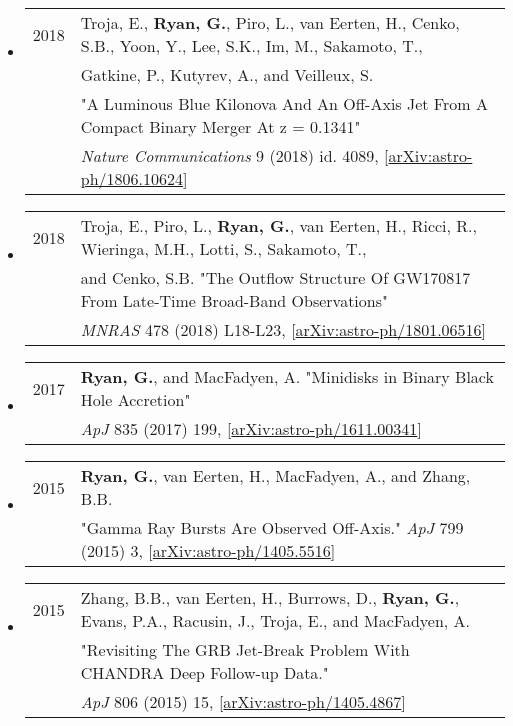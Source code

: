 \begin{itemize}
\item \begin{tabular}{ll}
2018 & Troja, E., {\bf Ryan, G.}, Piro, L., van Eerten, H., Cenko, S.B., Yoon, Y., Lee, S.K., Im, M., Sakamoto, T., \\
	& Gatkine, P., Kutyrev, A., and Veilleux, S. \\
	& "A Luminous Blue Kilonova And An Off-Axis Jet From A Compact Binary Merger At z = 0.1341"\\
	& \emph{Nature Communications} 9 (2018) id. 4089, [\href{https://arxiv.org/abs/1806.10624}{arXiv:astro-ph/1806.10624}]
\end{tabular}

\item \begin{tabular}{ll}
2018 & Troja, E., Piro, L., {\bf Ryan, G.}, van Eerten, H., Ricci, R., Wieringa, M.H., Lotti, S., Sakamoto, T.,\\
	& and Cenko, S.B. "The Outflow Structure Of GW170817 From Late-Time Broad-Band Observations" \\
	& \emph{MNRAS} 478 (2018) L18-L23, [\href{https://arxiv.org/abs/1801.06516}{arXiv:astro-ph/1801.06516}]
\end{tabular}

\item \begin{tabular}{ll}
2017 & {\bf Ryan, G.}, and MacFadyen, A. "Minidisks in Binary Black Hole Accretion" \\ 
	& \emph{ApJ} 835 (2017) 199, [\href{https://arxiv.org/abs/1611.00341}{arXiv:astro-ph/1611.00341}]
\end{tabular}

\item \begin{tabular}{ll}
2015 & {\bf Ryan, G.}, van Eerten, H., MacFadyen, A., and Zhang, B.B. \\ 
	& "Gamma Ray Bursts Are Observed Off-Axis."  \emph{ApJ} 799 (2015) 3, [\href{https://arxiv.org/abs/1405.5516}{arXiv:astro-ph/1405.5516}] \\
\end{tabular}

\item \begin{tabular}{ll}
2015 & Zhang, B.B., van Eerten, H., Burrows, D., {\bf Ryan, G.}, {Evans}, P.A., Racusin, J., Troja, E., and MacFadyen, A. \\
 & "Revisiting The GRB Jet-Break Problem With CHANDRA Deep Follow-up Data."  \\
&  \emph{ApJ} 806 (2015) 15, [\href{https://arxiv.org/abs/1405.4867}{arXiv:astro-ph/1405.4867}] \\
\end{tabular}


\end{itemize}
